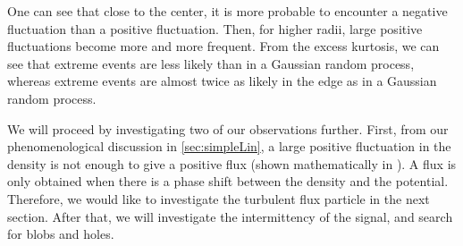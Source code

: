 One can see that close to the center, it is more probable to encounter a negative fluctuation than a positive fluctuation.
Then, for higher radii, large positive fluctuations become more and more frequent.
From the excess kurtosis, we can see that extreme events are less likely than in a Gaussian random process, whereas extreme events are almost twice as likely in the edge as in a Gaussian random process.

We will proceed by investigating two of our observations further.
First, from our phenomenological discussion in \cref{sec:simpleLin}, a large positive fluctuation in the density is not enough to give a positive flux (shown mathematically in \cite{Garcia2001a}).
A flux is only obtained when there is a phase shift between the density and the potential.
Therefore, we would like to investigate the turbulent flux particle in the next section.
After that, we will investigate the intermittency of the signal, and search for blobs and holes.
